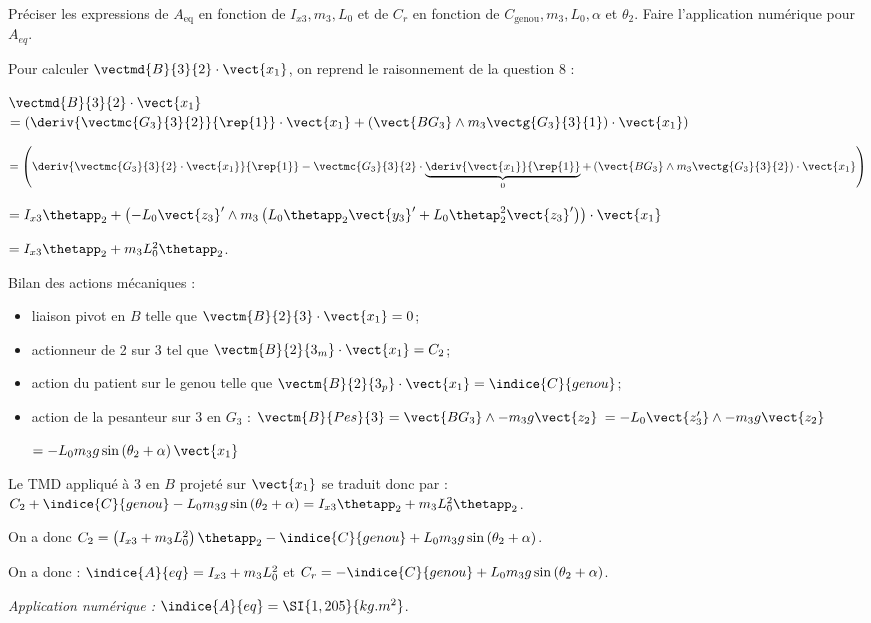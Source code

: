 \documentclass[11pt]{article}
\begin{document}
Préciser les expressions de $A_{\textrm{eq}}$ en fonction de $I_{x 3}, m_{3}, L_{0}$ et de $C_{r}$ en fonction de $C_{\textrm{genou}}, m_{3}, L_{0}, \alpha$ et $\theta_{2}$. Faire l'application numérique pour $A_{e q}$.
\begin{UPSTIcorrige}

Pour calculer $\vectmd{B}{3}{2} \cdot \vect{x_1}$, on reprend le raisonnement de la question 8 :  

 $\vectmd{B}{3}{2} \cdot \vect{x_1}$  
$= \left(\deriv{\vectmc{G_3}{3}{2}}{\rep{1}} \cdot \vect{x_1} + \left(\vect{BG_3} \wedge m_3 \vectg{G_3}{3}{1}\right)\cdot \vect{x_1} \right)  $

$= \left(\deriv{\vectmc{G_3}{3}{2}\cdot \vect{x_1}}{\rep{1}} - \vectmc{G_3}{3}{2}\cdot \underbrace{\deriv{ \vect{x_1}}{\rep{1}}}_{0}   + \left(\vect{BG_3} \wedge m_3 \vectg{G_3}{3}{2}\right)\cdot \vect{x_1} \right)  $

$=I_{x3}\thetapp_2 +\left( -L_0 \vect{z_3}'	 \wedge m_3  \left( L_0 \thetapp_2 \vect{y_3}' +L_0 \thetap_2^2 \vect{z_3}' \right)\right)\cdot \vect{x_1}$


$=I_{x3}\thetapp_2 + m_3 L_0^2 \thetapp_2  $.

Bilan des actions mécaniques : 
\begin{itemize}
\item liaison pivot en $B$ telle que $\vectm{B}{2}{3}\cdot \vect{x_1} = 0$;
\item actionneur de 2 sur 3 tel que  $\vectm{B}{2}{3_m}\cdot \vect{x_1} = C_2$;
\item action du patient sur le genou telle que  $\vectm{B}{2}{3_p}\cdot \vect{x_1} = \indice{C}{genou}$;
\item action de la pesanteur sur 3 en $G_3$ : $\vectm{B}{Pes}{3} = \vect{BG_3}\wedge -m_3 g\vect{z_2}$ $= -L_0 \vect{z_3'}\wedge -m_3 g\vect{z_2}$

$= - L_0 m_3 g \sin\left(\theta_2 + \alpha\right)\vect{x_1}$
\end{itemize}

Le TMD appliqué à 3 en $B$ projeté sur $\vect{x_1}$ se traduit donc par : 
$C_2 +\indice{C}{genou} - L_0 m_3 g \sin\left(\theta_2 + \alpha\right)=I_{x3}\thetapp_2 + m_3 L_0^2 \thetapp_2  $.

On a donc $C_2 = \left( I_{x3} + m_3 L_0^2 \right)\thetapp_2  - \indice{C}{genou} + L_0 m_3 g \sin\left(\theta_2 + \alpha\right) $.

On a donc : $\indice{A}{eq} = I_{x3} + m_3 L_0^2$ et $C_r =  - \indice{C}{genou} + L_0 m_3 g \sin\left(\theta_2 + \alpha\right)$.


\textit{Application numérique :} $\indice{A}{eq} =\SI{1,205}{kg.m^2}$.

\end{UPSTIcorrige}
\end{document}
